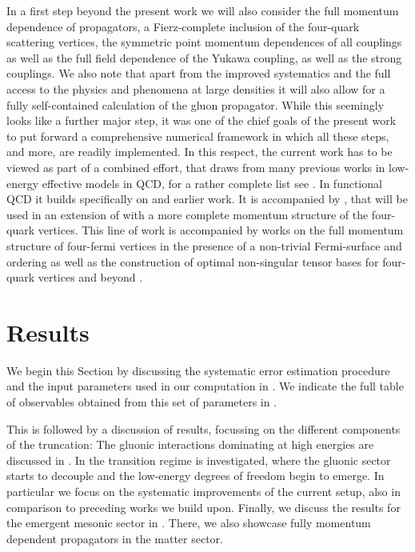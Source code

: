 \documentclass[aps,twocolumn,prd,superscriptaddress]{revtex4-2}
\begin{document}
In a first step beyond the present work we will also consider the full momentum dependence of propagators, a Fierz-complete inclusion of the four-quark scattering vertices, the symmetric point momentum dependences of all couplings as well as the full field dependence of the Yukawa coupling, as well as the strong couplings. We also note that apart from the improved systematics and the full access to the physics and phenomena at large densities it will also allow for a fully self-contained calculation of the gluon propagator. While this seemingly looks like a further major step, it was one of the chief goals of the present work to put forward a comprehensive numerical framework in which all these steps, and more, are readily implemented. In this respect, the current work has to be viewed as part of a combined effort, that draws from many previous works in low-energy effective models in QCD, for a rather complete list see \cite{Dupuis:2020fhh}. In functional QCD it builds specifically on \cite{Mitter:2014wpa, Cyrol:2016zqb, Cyrol:2017ewj, Fu:2019hdw} and earlier work. It is accompanied by \cite{Fu:2022uow, Fu:2024ysj}, that will be used in an extension \cite{FHPT2024} of \cite{Mitter:2014wpa, Cyrol:2017ewj} with a more complete momentum structure of the four-quark vertices. This line of work is accompanied by works on the full momentum structure of four-fermi vertices in the presence of a non-trivial Fermi-surface and ordering \cite{C?W2024} as well as the construction of optimal non-singular tensor bases for four-quark vertices and beyond \cite{?SW2024}. 


\section{Results}
\label{sec:Results}
	
We begin this Section by discussing the systematic error estimation procedure and the input parameters used in our computation in . We indicate the full table of observables obtained from this set of parameters in .

This is followed by a discussion of results, focussing on the different components of the truncation:
The gluonic interactions dominating at high energies are discussed in . In 
 the transition regime is investigated, where the gluonic sector starts to decouple and the low-energy degrees of freedom begin to emerge. In particular we focus on the systematic improvements of the current setup, also in comparison to preceding works \cite{Braun:2014ata, Fu:2019hdw} we build upon.
Finally, we discuss the results for the emergent mesonic sector in . There, we also showcase fully momentum dependent propagators in the matter sector.
\end{document}

